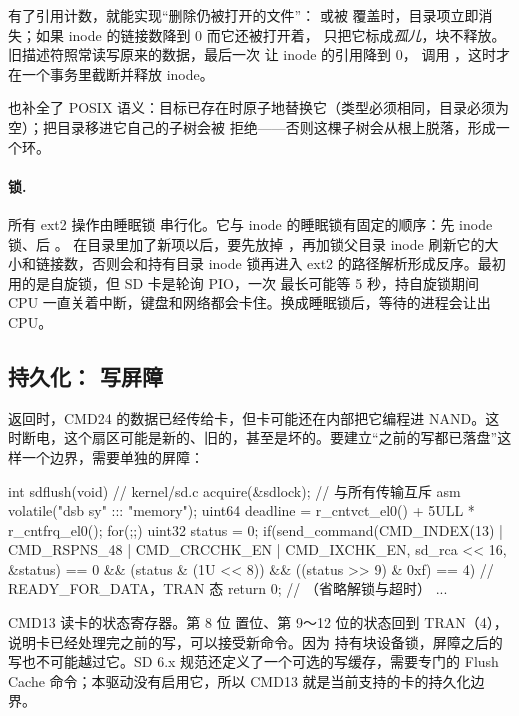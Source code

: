 有了引用计数，就能实现“删除仍被打开的文件”： 或被  覆盖时，目录项立即消失；如果 inode 的链接数降到 0 而它还被打开着， 只把它标成\emph{孤儿}，块不释放。旧描述符照常读写原来的数据，最后一次  让 inode 的引用降到 0， 调用 ，这时才在一个事务里截断并释放 inode。

 也补全了 POSIX 语义：目标已存在时原子地替换它（类型必须相同，目录必须为空）；把目录移进它自己的子树会被  拒绝——否则这棵子树会从根上脱落，形成一个环。

\paragraph{锁.} 所有 ext2 操作由睡眠锁  串行化。它与 inode 的睡眠锁有固定的顺序：先 inode 锁、后 。 在目录里加了新项以后，要先放掉 ，再加锁父目录 inode 刷新它的大小和链接数，否则会和持有目录 inode 锁再进入 ext2 的路径解析形成反序。最初用的是自旋锁，但 SD 卡是轮询 PIO，一次  最长可能等 5 秒，持自旋锁期间 CPU 一直关着中断，键盘和网络都会卡住。换成睡眠锁后，等待的进程会让出 CPU。

\subsection{持久化： 写屏障}

 返回时，CMD24 的数据已经传给卡，但卡可能还在内部把它编程进 NAND。这时断电，这个扇区可能是新的、旧的，甚至是坏的。要建立“之前的写都已落盘”这样一个边界，需要单独的屏障：

\begin{ccode}
int sdflush(void) {                                         // kernel/sd.c
  acquire(&sdlock);                                         // 与所有传输互斥
  asm volatile("dsb sy" ::: "memory");
  uint64 deadline = r_cntvct_el0() + 5ULL * r_cntfrq_el0();
  for(;;){
    uint32 status = 0;
    if(send_command(CMD_INDEX(13) | CMD_RSPNS_48 | CMD_CRCCHK_EN | CMD_IXCHK_EN,
                    sd_rca << 16, &status) == 0 &&
       (status & (1U << 8)) && ((status >> 9) & 0xf) == 4)  // READY_FOR_DATA，TRAN 态
      return 0;                                             // （省略解锁与超时）
    ...
  }
}
\end{ccode}

CMD13 读卡的状态寄存器。第 8 位  置位、第 9～12 位的状态回到 TRAN（4），说明卡已经处理完之前的写，可以接受新命令。因为  持有块设备锁，屏障之后的写也不可能越过它。SD 6.x 规范还定义了一个可选的写缓存，需要专门的 Flush Cache 命令；本驱动没有启用它，所以 CMD13 就是当前支持的卡的持久化边界。

